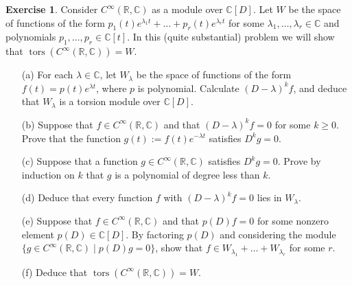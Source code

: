 \documentclass{amsart}
\newcommand{\tors}      {\operatorname{tors}}
\newcommand{\C}         {{\mathbb{C}}}
\newcommand{\R}         {{\mathbb{R}}}
\newcommand{\lm}        {\lambda}
\newcommand{\CRC}       {C^\infty(\R,\C)}
\newcommand{\st}        {\;|\;}
\newcommand{\ip}[1]     {\langle #1\rangle}
\renewcommand{\:}{\colon}
\theoremstyle{definition}
\newtheorem{exercise}{Exercise}[section]
\begin{document}
\begin{exercise}
 Consider $\CRC$ as a module over $\C[D]$.  Let $W$ be the space of
 functions of the form $p_1(t)e^{\lm_1t}+\ldots+p_r(t)e^{\lm_rt}$ for
 some $\lm_1,\ldots,\lm_r\in\C$ and polynomials
 $p_1,\ldots,p_r\in\C[t]$.  In this (quite substantial) problem we
 will show that $\tors(\CRC)=W$.
 \begin{itemize}
  \item[(a)] For each $\lm\in\C$, let $W_\lm$ be the space of
   functions of the form $f(t)=p(t)e^{\lm t}$, where $p$ is
   polynomial.  Calculate $(D-\lm)^kf$, and deduce that $W_\lm$ is a
   torsion module over $\C[D]$.
  \item[(b)] Suppose that $f\in\CRC$ and that $(D-\lm)^kf=0$ for some
   $k\geq 0$.  Prove that the function $g(t):=f(t)e^{-\lm t}$
   satisfies $D^kg=0$.
  \item[(c)] Suppose that a function $g\in\CRC$ satisfies $D^kg=0$.
   Prove by induction on $k$ that $g$ is a polynomial of degree less
   than $k$.  
  \item[(d)] Deduce that every function $f$ with $(D-\lm)^kf=0$ lies
   in $W_\lm$.
  \item[(e)] Suppose that $f\in \CRC$ and that $p(D)f=0$ for some
   nonzero element $p(D)\in\C[D]$.  By factoring $p(D)$ and
   considering the module $\{g\in\CRC\st p(D)g=0\}$, show that
   $f\in W_{\lm_1}+\ldots+W_{\lm_r}$ for some $r$.
  \item[(f)] Deduce that $\tors(\CRC)=W$.
 \end{itemize}
\end{exercise}
\end{document}
